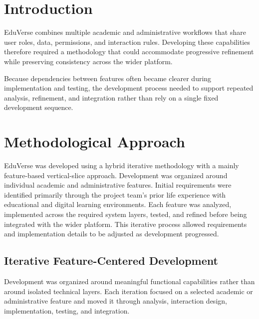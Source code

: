 
\section{Introduction}\label{sec:methodology_introduction}

EduVerse combines multiple academic and administrative workflows that share
user roles, data, permissions, and interaction rules. Developing these
capabilities therefore required a methodology that could accommodate
progressive refinement while preserving consistency across the wider platform.

Because dependencies between features often became clearer during
implementation and testing, the development process needed to support repeated
analysis, refinement, and integration rather than rely on a single fixed
development sequence.

\section{Methodological Approach}\label{sec:system_development_methodology}

EduVerse was developed using a hybrid iterative methodology with a mainly feature-based vertical-slice approach. Development was organized around individual academic and administrative features. Initial requirements were identified primarily through the project team’s prior life experience with educational and digital learning environments. Each feature was analyzed, implemented across the required system layers, tested, and refined before being integrated with the wider platform. This iterative process allowed requirements and implementation details to be adjusted as development progressed.
\subsection{Iterative Feature-Centered Development}\label{subsec:feature_based_iterative_workflow}

Development was organized around meaningful functional capabilities rather
than around isolated technical layers. Each iteration focused on a selected
academic or administrative feature and moved it through analysis, interaction
design, implementation, testing, and integration.

